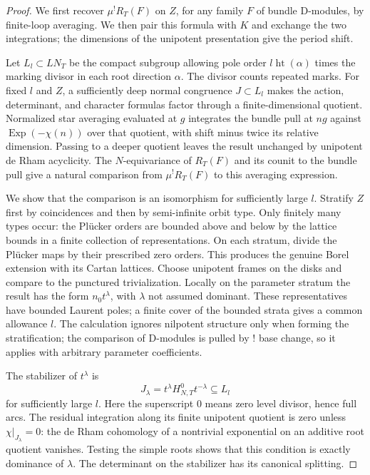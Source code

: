 \documentclass[11pt]{article}
\numberwithin{equation}{section}
\theoremstyle{definition}
\theoremstyle{remark}
\begin{document}
\begin{proof}
We first recover $\mu^!R_T(F)$ on $Z$, for any family $F$ of bundle
D-modules, by finite-loop averaging.  We then pair this formula with
$K$ and exchange the two integrations; the dimensions of the unipotent
presentation give the period shift.

Let $L_l\subset LN_T$ be the compact subgroup
allowing pole order $l\operatorname{ht}(\alpha)$ times the marking
divisor in each root direction $\alpha$.  The divisor counts repeated
marks.  For fixed $l$ and $Z$, a sufficiently deep normal congruence
$J\subset L_l$ makes the action, determinant, and character formulas
factor through a finite-dimensional quotient.  Normalized star
averaging evaluated at $g$ integrates the bundle pull at $ng$
against $\operatorname{Exp}(-\chi(n))$ over that quotient, with shift
minus twice its relative dimension.  Passing to a deeper quotient
leaves the result unchanged by unipotent de Rham acyclicity.  The
$N$-equivariance of $R_T(F)$ and its counit to the bundle pull give a
natural comparison from $\mu^!R_T(F)$ to this averaging expression.

We show that the comparison is an isomorphism for sufficiently large
$l$.  Stratify $Z$ first by coincidences and then by semi-infinite orbit
type.  Only finitely many types occur: the Pl\"ucker orders are bounded
above and below by the lattice bounds in a finite collection of
representations.  On each stratum, divide the Pl\"ucker maps by their
prescribed zero orders.  This produces the genuine Borel extension
with its Cartan lattices.  Choose unipotent frames on the disks and
compare to the punctured trivialization.  Locally on the parameter
stratum the result has the form $n_0t^\lambda$, with $\lambda$ not
assumed dominant.  These representatives have bounded Laurent poles;
a finite cover of the bounded strata gives a common allowance $l$.
The calculation ignores nilpotent structure only when forming the
stratification; the comparison of D-modules is pulled by $!$ base
change, so it applies with arbitrary parameter coefficients.

The stabilizer of $t^\lambda$ is
\[
 J_\lambda=t^\lambda H_{N,T}^0t^{-\lambda}\subseteq L_l
\]
for sufficiently large $l$.  Here the superscript $0$ means zero level
divisor, hence full arcs.  The residual integration along its finite
unipotent quotient is zero unless $\chi|_{J_\lambda}=0$: the de Rham
cohomology of a nontrivial exponential on an additive root quotient
vanishes.  Testing the simple roots shows that this condition is
exactly dominance of $\lambda$.  The determinant on the stabilizer
has its canonical splitting.


\end{proof}
\end{document}
